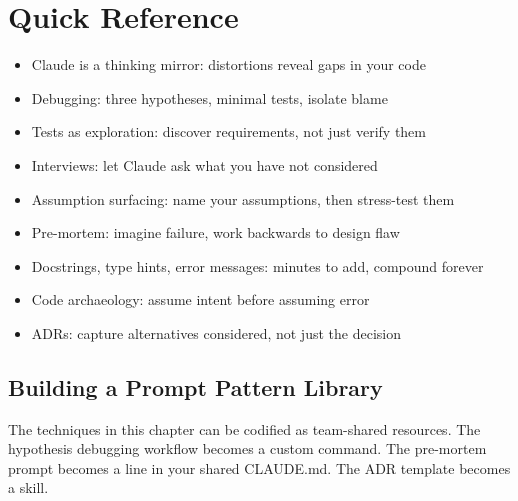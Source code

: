 


\section{Quick Reference}
\label{sec:thinking-reference}

\begin{itemize}
  \item Claude is a thinking mirror: distortions reveal gaps in your code
  \item Debugging: three hypotheses, minimal tests, isolate blame
  \item Tests as exploration: discover requirements, not just verify them
  \item Interviews: let Claude ask what you have not considered
  \item Assumption surfacing: name your assumptions, then stress-test them
  \item Pre-mortem: imagine failure, work backwards to design flaw
  \item Docstrings, type hints, error messages: minutes to add, compound forever
  \item Code archaeology: assume intent before assuming error
  \item ADRs: capture alternatives considered, not just the decision
\end{itemize}

\subsection{Building a Prompt Pattern Library}

The techniques in this chapter can be codified as team-shared resources.
The hypothesis debugging workflow becomes a custom command.
The pre-mortem prompt becomes a line in your shared CLAUDE.md.
The ADR template becomes a skill.

